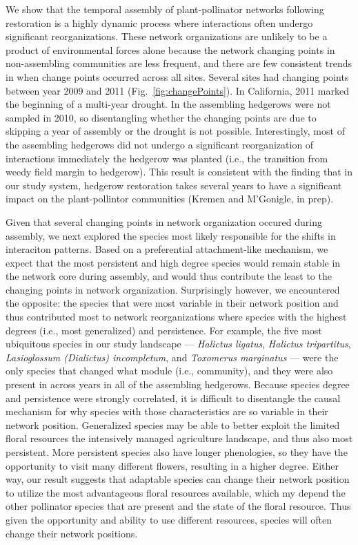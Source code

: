 \documentclass[12pt]{article}
\begin{document}
We show that the temporal assembly of plant-pollinator networks
following restoration is a highly dynamic process where interactions
often undergo significant reorganizations. These network organizations
are unlikely to be a product of environmental forces alone because the
network changing points in non-assembling communities are less
frequent, and there are few consistent trends in when change points
occurred across all sites. Several sites had changing points between
year 2009 and 2011 (Fig.~\ref{fig:changePoints}). In California, 2011
marked the beginning of a multi-year drought. In the assembling
hedgerows were not sampled in 2010, so disentangling whether the
changing points are due to skipping a year of assembly or the drought
is not possible. Interestingly, most of the assembling hedgerows did
not undergo a significant reorganization of interactions immediately
the hedgerow was planted (i.e., the transition from weedy field margin
to hedgerow). This result is consistent with the finding that in our
study system, hedgerow restoration takes several years to have a
significant impact on the plant-pollintor communities (Kremen and
M'Gonigle, in prep).

Given that several changing points in network organization occured
during assembly, we next explored the species most likely responsible
for the shifts in interaciton patterns. Based on a preferential
attachment-like mechanism, we expect that the most persistent and high
degree species would remain stable in the network core during
assembly, and would thus contribute the least to the changing points
in network organization. Surprisingly however, we encountered the
opposite: the species that were most variable in their network
position and thus contributed most to network reorganizations where
species with the highest degrees (i.e., most generalized) and
persistence. For example, the five most ubiquitous species in our
study landscape --- \textit{Halictus ligatus}, \textit{Halictus
  tripartitus}, \textit{Lasioglossum (Dialictus) incompletum}, and
\textit{Toxomerus marginatus} --- were the only species that changed
what module (i.e., community), and they were also present in across
years in all of the assembling hedgerows. Because species degree and
persistence were strongly correlated, it is difficult to disentangle
the causal mechanism for why species with those characteristics are so
variable in their network position. Generalized species may be able to
better exploit the limited floral resources the intensively managed
agriculture landscape, and thus also most persistent. More persistent
species also have longer phenologies, so they have the opportunity to
visit many different flowers, resulting in a higher degree. Either
way, our result suggests that adaptable species can change their
network position to utilize the most advantageous floral resources
available, which my depend the other pollinator species that are
present and the state of the floral resource. Thus given the
opportunity and ability to use different resources, species will often
change their network positions.
\end{document}
